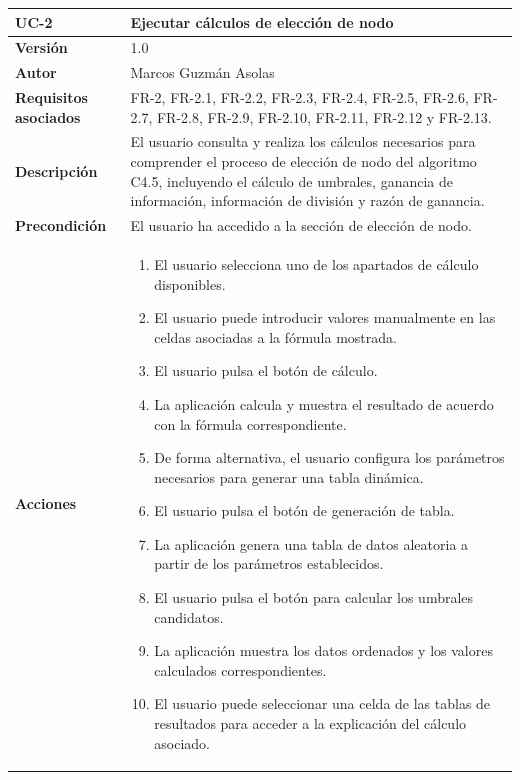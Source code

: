 \begin{table}[p]
    \centering
    \begin{tabularx}{\linewidth}{p{} p{}}
        \toprule
        \textbf{UC-2} & \textbf{Ejecutar cálculos de elección de nodo} \\
        \toprule
        \textbf{Versión} & 1.0 \\
        \textbf{Autor} & Marcos Guzmán Asolas \\
        \textbf{Requisitos asociados} & FR-2, FR-2.1, FR-2.2, FR-2.3, FR-2.4, FR-2.5, FR-2.6, FR-2.7, FR-2.8, FR-2.9, FR-2.10, FR-2.11, FR-2.12 y FR-2.13. \\
        \textbf{Descripción} & El usuario consulta y realiza los cálculos necesarios para comprender el proceso de elección de nodo del algoritmo C4.5, incluyendo el cálculo de umbrales, ganancia de información, información de división y razón de ganancia. \\
        \textbf{Precondición} & El usuario ha accedido a la sección de elección de nodo. \\
        \textbf{Acciones} &
        \begin{enumerate}
            \def\labelenumi{\arabic{enumi}.}
            \tightlist
            \item El usuario selecciona uno de los apartados de cálculo disponibles.
            \item El usuario puede introducir valores manualmente en las celdas asociadas a la fórmula mostrada.
            \item El usuario pulsa el botón de cálculo.
            \item La aplicación calcula y muestra el resultado de acuerdo con la fórmula correspondiente.
            \item De forma alternativa, el usuario configura los parámetros necesarios para generar una tabla dinámica.
            \item El usuario pulsa el botón de generación de tabla.
            \item La aplicación genera una tabla de datos aleatoria a partir de los parámetros establecidos.
            \item El usuario pulsa el botón para calcular los umbrales candidatos.
            \item La aplicación muestra los datos ordenados y los valores calculados correspondientes.
            \item El usuario puede seleccionar una celda de las tablas de resultados para acceder a la explicación del cálculo asociado.

\end{enumerate}
\end{tabularx}
\end{table}
